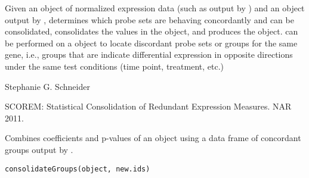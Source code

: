 \documentclass[a4paper]{book}
\begin{document}
\begin{Details}\relax

Given an  object of normalized expression data (such as output by ) and an  object output by ,  determines which probe sets are behaving concordantly and can be consolidated,  consolidates the values in the  object, and  produces the  object.  can be performed on a  object to locate discordant probe sets or groups for the same gene, i.e., groups that are indicate differential expression in opposite directions under the same test conditions (time point, treatment, etc.)
\end{Details}
%
\begin{Author}\relax
Stephanie G. Schneider
\end{Author}
%
\begin{References}\relax
SCOREM: Statistical Consolidation of Redundant Expression Measures.  NAR 2011.
\end{References}
%
\begin{SeeAlso}\relax
{}
\end{SeeAlso}
%
\begin{Description}\relax
Combines coefficients and p-values of an  object using a data frame of concordant groups output by .
\end{Description}
%
\begin{Usage}
\begin{verbatim}
consolidateGroups(object, new.ids)
\end{verbatim}
\end{Usage}
\end{document}
